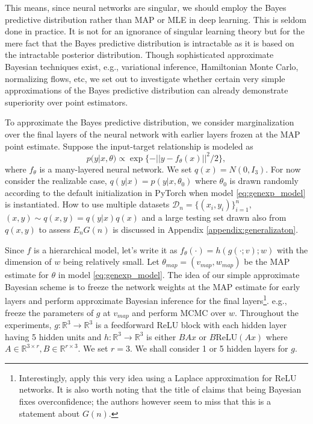 \documentclass{article} %
\begin{document}
This means, since neural networks are singular, we should employ the Bayes predictive distribution rather than MAP or MLE in deep learning. This is seldom done in practice. It is not for an ignorance of singular learning theory but for the mere fact that the Bayes predictive distribution is intractable as it is based on the intractable posterior distribution. 
Though sophisticated approximate Bayesian techniques exist, e.g., variational inference, Hamiltonian Monte Carlo, normalizing flows, etc, we set out to investigate whether certain very simple approximations of the Bayes predictive distribution can already demonstrate superiority over point estimators. 

To approximate the Bayes predictive distribution, we consider marginalization over the final layers of the neural network with earlier layers frozen at the MAP point estimate. Suppose the input-target relationship is modeled as
\begin{equation}
p(y|x,\theta) \propto \exp\{-|| y - f_\theta(x) ||^2/2\},
\label{eq:genexp_model}
\end{equation}
where $f_\theta$ is a many-layered neural network.
We set $q(x) = N(0,I_3)$. 
For now consider the realizable case, $q(y|x) = p(y|x,\theta_0)$ where $\theta_0$ is drawn randomly according to the default initialization in PyTorch when model \ref{eq:genexp_model} is instantiated. How to use multiple datasets $\mathcal D_n = \{(x_i,y_i)\}_{i=1}^n$, $(x,y) \sim q(x,y) = q(y|x)q(x)$ and a large testing set drawn also from $q(x,y)$ to assess $E_n G(n)$ is discussed in Appendix \ref{appendix:generalizaton}. 

 Since $f$ is a hierarchical model, let's write it as $f_\theta(\cdot) = h(g(\cdot;v);w)$ with the dimension of $w$ being relatively small. Let $\theta_{map} = (v_{map}, w_{map})$ be the MAP estimate for $\theta$ in model \ref{eq:genexp_model}. The idea of our simple approximate Bayesian scheme is to freeze the network weights at the MAP estimate for early layers and perform approximate Bayesian inference for the final layers\footnote{Interestingly, \citet{kristiadi_being_2020} apply this very idea using a Laplace approximation for ReLU networks. It is also worth noting that the title of \citet{kristiadi_being_2020} claims that being Bayesian fixes overconfidence; the authors however seem to  miss that this is a statement  about $G(n)$.}. e.g., freeze the parameters of $g$ at $v_{map}$ and perform MCMC over $w$. 
Throughout the experiments, $g: \mathbb R^3 \to \mathbb R^3$ is a feedforward ReLU block with each hidden layer having 5 hidden units and $h: \mathbb R^3 \to \mathbb R^3$ is either $BAx$ or $B\text{ReLU}(Ax)$ where $A \in \mathbb R^{3 \times r}, B \in \mathbb R^{r \times 3}$. We set $r=3$. We shall consider 1 or 5 hidden layers for $g$. 
\end{document}

